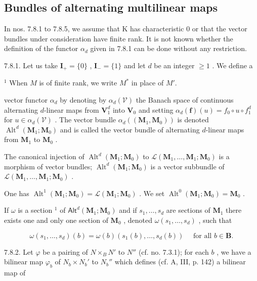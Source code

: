 \subsection{Bundles of alternating multilinear maps}

In nos. 7.8.1 to 7.8.5, we assume that K has characteristic 0 or that the vector bundles under consideration have finite rank. It is not known whether the definition of the functor \(\alpha_{d}\) given in 7.8.1 can be done without any restriction.

7.8.1. Let us take \(\mathbf{I}_{+} = \{0\}\) , \(\mathbf{I}_{-} = \{1\}\) and let \(d\) be an integer \(\geqslant 1\) . We define a

\(^{1}\) When \(M\) is of finite rank, we write \(M^{*}\) in place of \(M'\).

vector functor \(\alpha_{d}\) by denoting by \(\alpha_{d}(\mathcal{V})\) the Banach space of continuous alternating \(d\)-linear maps from \(\mathbf{V}_{1}^{d}\) into \(\mathbf{V}_{0}\) and setting \(\alpha_{d}(\mathbf{f})(u) = f_{0} \circ u \circ f_{1}^{d}\) for \(u \in \alpha_{d}(\mathcal{V})\) . The vector bundle \(\alpha_{d}((\mathbf{M}_{1}, \mathbf{M}_{0}))\) is denoted \(\operatorname{Alt}^{d}(\mathbf{M}_{1}; \mathbf{M}_{0})\) and is called the vector bundle of alternating \(d\)-linear maps from \(\mathbf{M}_{1}\) to \(\mathbf{M}_{0}\) .

The canonical injection of \(\operatorname{Alt}^{d}(\mathbf{M}_{1};\mathbf{M}_{0})\) to \(\mathcal{L}(\mathbf{M}_{1},\ldots,\mathbf{M}_{1};\mathbf{M}_{0})\) is a morphism of vector bundles; \(\operatorname{Alt}^{d}(\mathbf{M}_{1};\mathbf{M}_{0})\) is a vector subbundle of \(\mathcal{L}(\mathbf{M}_{1},\ldots,\mathbf{M}_{1};\mathbf{M}_{0})\) .

One has \(\operatorname{Alt}^1 (\mathbf{M}_1;\mathbf{M}_0) = \mathcal{L}(\mathbf{M}_1;\mathbf{M}_0)\) . We set \(\operatorname{Alt}^0 (\mathbf{M}_1;\mathbf{M}_0) = \mathbf{M}_0\) .

If \(\omega\) is a section \(^{1}\) of \(\mathsf{Alt}^{d}(\mathbf{M}_{1};\mathbf{M}_{0})\) and if \(s_{1},\ldots,s_{d}\) are sections of \(\mathbf{M}_{1}\) there exists one and only one section of \(\mathbf{M}_{0}\) , denoted \(\omega(s_{1},\ldots,s_{d})\) , such that

\[
\omega (s _ {1}, \dots , s _ {d}) (b) = \omega (b) (s _ {1} (b), \dots , s _ {d} (b)) \quad \text { for all } b \in \mathbf {B}.
\]

7.8.2. Let \(\varphi\) be a pairing of \(N \times_{B} N'\) to \(N''\) (cf. no. 7.3.1); for each \(b\) , we have a bilinear map \(\varphi_b\) of \(N_b \times N_b'\) to \(N_b''\) which defines (cf. A, III, p. 142) a bilinear map of

